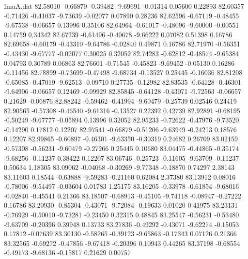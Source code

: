 \begin{filecontents}{ImuA.dat}
  82.58010   -0.66879   -0.39482   -9.69691   -0.01314    0.05600    0.22893
  82.60357   -0.71426   -0.41037   -9.73639   -0.02077    0.07890    0.28236
  82.62596   -0.67119   -0.48455   -9.67538   -0.06657    0.13996    0.35106
  82.64964   -0.61017   -0.48096   -9.60000   -0.00551    0.14759    0.34342
  82.67239   -0.61496   -0.40678   -9.66222    0.07082    0.51398    0.16786
  82.69658   -0.60179   -0.43310   -9.64786   -0.02840    0.49871    0.16786
  82.71970   -0.56351   -0.43430   -9.67777   -0.02077    0.30025    0.32052
  82.74283   -0.62812   -0.48574   -9.65384    0.04793    0.30789    0.06863
  82.76601   -0.71545   -0.45823   -9.69452   -0.05130    0.16286   -0.11456
  82.78899   -0.73699   -0.47498   -9.68734   -0.13527    0.25445   -0.16036
  82.81208   -0.65085   -0.47019   -9.62513   -0.09710    0.27735   -0.12982
  82.83535   -0.64128   -0.46301   -9.64906   -0.06657    0.12469   -0.09929
  82.85845   -0.64128   -0.43071   -9.72563   -0.06657    0.21629   -0.06876
  82.88242   -0.59462   -0.41994   -9.60479   -0.25739    0.02546    0.24419
  82.90565   -0.57308   -0.46540   -9.61316   -0.13527    0.22392    0.42739
  82.92891   -0.68195   -0.50249   -9.67777   -0.05894    0.13996    0.32052
  82.95233   -0.72622   -0.47976   -9.73520   -0.14290    0.17812    0.12207
  82.97541   -0.66879   -0.51206   -9.63949   -0.24213    0.18576    0.12207
  82.99865   -0.60897   -0.46301   -9.63350   -0.30319    0.24682    0.26709
  83.02159   -0.57308   -0.56231   -9.60479   -0.27266    0.25445    0.10680
  83.04475   -0.44865   -0.35174   -9.68256   -0.11237    0.38422    0.12207
  83.06746   -0.25723   -0.11605   -9.63709   -0.11237    0.50634    1.18305
  83.09062   -0.04068   -0.30269   -9.77348   -0.18870    0.74297    2.38143
  83.11603    0.18544   -0.63888   -9.59283   -0.21160    0.62084    2.37380
  83.13912    0.08016   -0.78006   -9.54497   -0.03604    0.01783    1.25175
  83.16205   -0.33978   -0.61854   -9.68016   -0.02840   -0.45541    0.21366
  83.18507   -0.68913   -0.45105   -9.74118   -0.08947   -0.27222    0.16786
  83.20930   -0.85304   -0.43071   -9.72084   -0.19633    0.01020    0.41975
  83.23131   -0.76929   -0.50010   -9.73281   -0.23450    0.32315    0.48845
  83.25547   -0.56231   -0.53480   -9.63709   -0.20396    0.39948    0.13733
  83.27836   -0.49292   -0.43071   -9.62274   -0.15053    0.17812   -0.07639
  83.30130   -0.58265   -0.39123   -9.65863   -0.17343    0.07126    0.21366
  83.32565   -0.69272   -0.47856   -9.67418   -0.20396    0.10943    0.44265
  83.37198   -0.68554   -0.49173   -9.68136   -0.15817    0.21629    0.00757

\end{filecontents}
